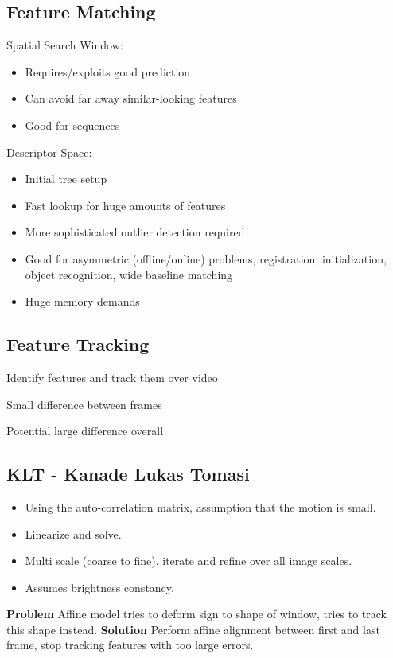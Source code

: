 \subsection{Feature Matching}

Spatial Search Window:
\begin{itemize}
\item Requires/exploits good prediction
\item Can avoid far away similar-looking features
\item Good for sequences
\end{itemize}

Descriptor Space:
\begin{itemize}
\item Initial tree setup
\item Fast lookup for huge amounts of features
\item More sophisticated outlier detection required
\item Good for asymmetric (offline/online) problems, registration, initialization, object recognition, wide baseline matching
\item Huge memory demands
\end{itemize}



\subsection{Feature Tracking}

Identify features and track them over video

Small difference between frames

Potential large difference overall

\subsection{KLT - Kanade Lukas Tomasi}
\begin{itemize}
\item Using the auto-correlation matrix, assumption that the motion is small.
\item Linearize and solve.
\item Multi scale (coarse to fine), iterate and refine over all image scales.
\item Assumes brightness constancy.
\end{itemize}

\textbf{Problem}  Affine model tries to deform sign to shape of window, tries to track this shape instead. 
\textbf{Solution} Perform affine alignment between first and last frame, stop tracking features with too large errors. 

